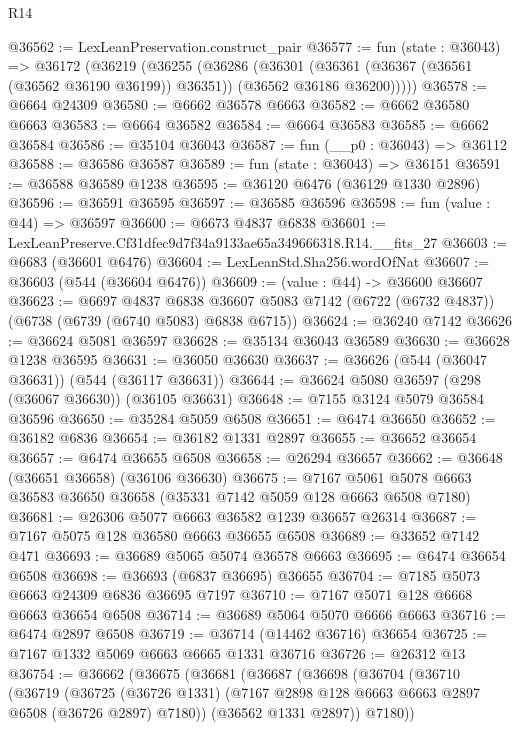 \begin{lexlean}{R14}
\begin{coremodule}
@36562 := LexLeanPreservation.construct_pair
@36577 := fun (state : @36043) =>
  @36172
    (@36219
      (@36255
        (@36286
          (@36301
            (@36361 (@36367 (@36561 (@36562 @36190 @36199)) @36351))
            (@36562 @36186 @36200)))))
@36578 := @6664 @24309
@36580 := @6662 @36578 @6663
@36582 := @6662 @36580 @6663
@36583 := @6664 @36582
@36584 := @6664 @36583
@36585 := @6662 @36584
@36586 := @35104 @36043
@36587 := fun (__p0 : @36043) => @36112
@36588 := @36586 @36587
@36589 := fun (state : @36043) => @36151
@36591 := @36588 @36589 @1238
@36595 := @36120 @6476 (@36129 @1330 @2896)
@36596 := @36591 @36595
@36597 := @36585 @36596
@36598 := fun (value : @44) => @36597
@36600 := @6673 @4837 @6838
@36601 := LexLeanPreserve.Cf31dfec9d7f34a9133ae65a349666318.R14.__fits_27
@36603 := @6683 (@36601 @6476)
@36604 := LexLeanStd.Sha256.wordOfNat
@36607 := @36603 (@544 (@36604 @6476))
@36609 := (value : @44) -> @36600 @36607
@36623 := @6697
    @4837
    @6838
    @36607
    @5083
    @7142
    (@6722 (@6732 @4837))
    (@6738 (@6739 (@6740 @5083) @6838 @6715))
@36624 := @36240 @7142
@36626 := @36624 @5081 @36597
@36628 := @35134 @36043 @36589
@36630 := @36628 @1238 @36595
@36631 := @36050 @36630
@36637 := @36626 (@544 (@36047 @36631)) (@544 (@36117 @36631))
@36644 := @36624 @5080 @36597 (@298 (@36067 @36630)) (@36105 @36631)
@36648 := @7155 @3124 @5079 @36584 @36596
@36650 := @35284 @5059 @6508
@36651 := @6474 @36650
@36652 := @36182 @6836
@36654 := @36182 @1331 @2897
@36655 := @36652 @36654
@36657 := @6474 @36655 @6508
@36658 := @26294 @36657
@36662 := @36648 (@36651 @36658) (@36106 @36630)
@36675 := @7167 @5061 @5078 @6663 @36583 @36650 @36658 (@35331 @7142 @5059 @128 @6663 @6508 @7180)
@36681 := @26306 @5077 @6663 @36582 @1239 @36657 @26314
@36687 := @7167 @5075 @128 @36580 @6663 @36655 @6508
@36689 := @33652 @7142 @471
@36693 := @36689 @5065 @5074 @36578 @6663
@36695 := @6474 @36654 @6508
@36698 := @36693 (@6837 @36695) @36655
@36704 := @7185 @5073 @6663 @24309 @6836 @36695 @7197
@36710 := @7167 @5071 @128 @6668 @6663 @36654 @6508
@36714 := @36689 @5064 @5070 @6666 @6663
@36716 := @6474 @2897 @6508
@36719 := @36714 (@14462 @36716) @36654
@36725 := @7167 @1332 @5069 @6663 @6665 @1331 @36716
@36726 := @26312 @13
@36754 := @36662
    (@36675
      (@36681
        (@36687
          (@36698
            (@36704
              (@36710
                (@36719
                  (@36725
                    (@36726 @1331)
                    (@7167 @2898 @128 @6663 @6663 @2897 @6508 (@36726 @2897) @7180))
                  (@36562 @1331 @2897))
                @7180))

\end{coremodule}
\end{lexlean}
